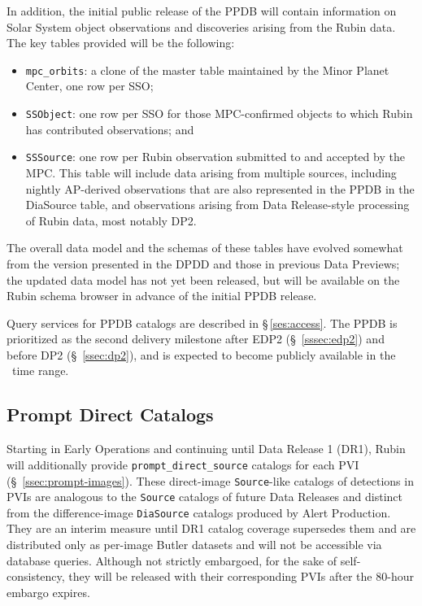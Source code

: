 In addition, the initial public release of the PPDB will contain information on Solar System object observations
and discoveries arising from the Rubin data.
The key tables provided will be the following:
\begin{itemize}
  \item \texttt{mpc\_orbits}: a clone of the master table maintained by the Minor Planet Center, one row per SSO;
  \item \texttt{SSObject}: one row per SSO for those MPC-confirmed objects to which Rubin has contributed observations; and
  \item \texttt{SSSource}: one row per Rubin observation submitted to and accepted by the MPC.
    This table will include data arising from multiple sources, including nightly AP-derived observations that are also
    represented in the PPDB in the DiaSource table,
    and observations arising from Data Release-style processing of Rubin data, most notably DP2.
\end{itemize}
The overall data model and the schemas of these tables have evolved somewhat from the version presented in the DPDD
and those in previous Data Previews;
the updated data model has not yet been released, but will be available on the Rubin schema browser in advance of
the initial PPDB release.

Query services for PPDB catalogs are described in \S\,\ref{ses:access}.
The PPDB is prioritized as the second delivery milestone after EDP2 (\S~\ref{sssec:edp2}) and before DP2 (\S~\ref{ssec:dp2}), and is expected to become publicly available in the \ppdbdate\ time range.

\subsection{Prompt Direct Catalogs}
\label{ssec:prompt-direct-catalogs}

Starting in Early Operations and continuing until Data Release 1 (DR1), Rubin will additionally provide \texttt{prompt\_direct\_source} catalogs for each PVI (\S~\ref{ssec:prompt-images}).
These direct-image \texttt{Source}-like catalogs of detections in PVIs are analogous to the \texttt{Source} catalogs of future Data Releases and distinct from the difference-image \texttt{DiaSource} catalogs produced by Alert Production.
They are an interim measure until DR1 catalog coverage supersedes them and are distributed only as per-image Butler datasets and will not be accessible via database queries.
Although not strictly embargoed, for the sake of self-consistency, they will be released with their corresponding PVIs after the 80-hour embargo expires.
